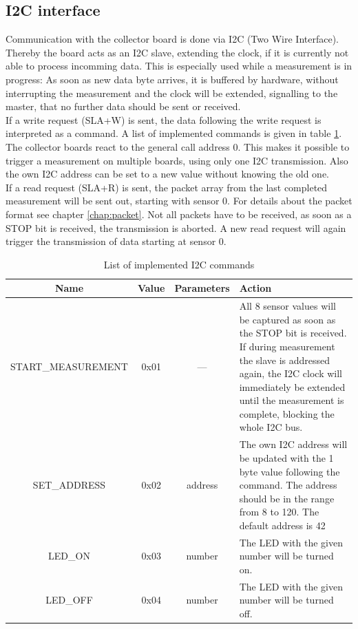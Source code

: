 \documentclass[a4paper]{scrreprt}
\begin{document}
\subsection{I2C interface}
Communication with the collector board is done via I2C (Two Wire Interface). Thereby the board acts as an
I2C slave, extending the clock, if it is currently not able to process incomming data.
This is especially used while a measurement is in progress: As soon as new data byte arrives,
it is buffered by hardware, without interrupting the measurement and the clock will be extended, signalling to the master, that no further data should be sent or received.\\
If a write request (SLA+W) is sent, the data following the write request is interpreted as a command. A list of implemented commands is given
in table \ref{tab:i2c}. The collector boards react to the general call address 0. This makes it possible to trigger a measurement
on multiple boards, using only one I2C transmission.
Also the own I2C address can be set to a new value without knowing the old one.\\
If a read request (SLA+R) is sent, the packet array from the last completed measurement will be sent out, starting with sensor 0.
For details about the packet format see chapter \ref{chap:packet}. Not all packets have to be received, as soon as a STOP bit is
received, the transmission is aborted. A new read request will again trigger the transmission of data starting at sensor 0.
\begin{table}[Hh!]
	\centering
	\begin{tabularx}{\textwidth}{ | c | c | c | X | }
		\hline
    Name & Value & Parameters & Action\\
		\hline
		\hline
    START\_MEASUREMENT & 0x01 & --- & All 8 sensor values will be
    captured as soon as the STOP bit is received. If during
    measurement
		the slave is addressed again, the I2C clock will immediately be extended until the measurement is complete, blocking the whole I2C bus.\\
		\hline
    SET\_ADDRESS & 0x02 & address & The own I2C address will be updated with the 1 byte value following the command. The address should
		be in the range from 8 to 120. The default address is 42\\
		\hline
    LED\_ON & 0x03 & number & The LED with the given number will be turned on.\\
		\hline
    LED\_OFF & 0x04 & number & The LED with the given number will be turned off.\\
		\hline
	\end{tabularx}
	\caption{List of implemented I2C commands}
	\label{tab:i2c}
\end{table}
\end{document}
